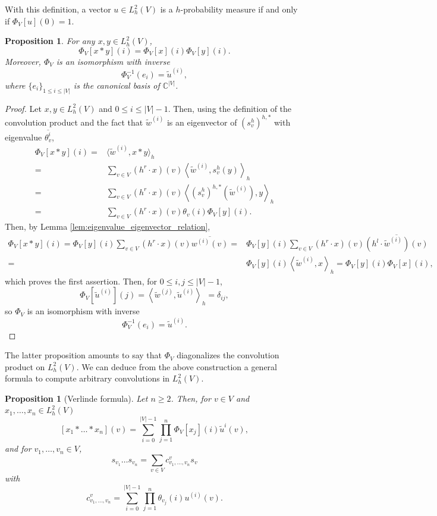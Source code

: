 \documentclass[10pt,11pt]{amsart}%
\newtheorem{proposition}[theorem]{Proposition}
\begin{document}
With this definition, a vector $u\in L^2_h(V)$ is a $h$-probability measure if and only if $\Phi_V[u](0)=1$.
\begin{proposition}\label{prop:diagonalization_Fourier}
For any $x,y\in L^2_h(V)$,
$$\Phi_V[x\ast y](i)=\Phi_V[x](i)\Phi_V[y](i).$$
Moreover, $\Phi_V$ is an isomorphism with inverse
$$\Phi_V^{-1}(e_{i})=\tilde{u}^{(i)},$$
where $\{e_i\}_{1\leq i\leq \vert V\vert}$ is the canonical basis of $\mathbb{C}^{\vert V\vert}$.
\end{proposition}
\begin{proof}
Let $x,y\in L^2_h(V)$ and $0\leq i\leq \vert V\vert-1$. Then, using the definition of the convolution product and the fact that $\tilde{w}^{(i)}$ is an eigenvector of $(s_v^h)^{h,*}$ with eigenvalue $\overline{\theta_v^i}$,
\begin{align*}
\Phi_V[x\ast y](i)=&\langle \tilde{w}^{(i)},x\ast y\rangle_h\\
=&\sum_{v\in V}(h^r\cdot x)(v)\left\langle \tilde{w}^{(i)},s_v^h(y)\right\rangle_h\\
=&\sum_{v\in V}(h^r\cdot x)(v)\left\langle (s_v^h)^{h,*}(\tilde{w}^{(i)}),y\right\rangle_h\\
=&\sum_{v\in V}(h^r\cdot x)(v)\theta_v(i)\Phi_V[y](i).
\end{align*}
Then, by Lemma \ref{lem:eigenvalue_eigenvector_relation},
\begin{align*}
\Phi_V[x\ast y](i)=\Phi_V[y](i)\sum_{v\in V}(h^r\cdot x)(v)\overline{w^{(i)}(v)}=&\Phi_V[y](i)\sum_{v\in V}(h^r\cdot x)(v) \overline{(h^l\cdot \tilde{w}^{(i)})(v)}\\
=&\Phi_V[y](i)\left\langle \tilde{w}^{(i)},x\right\rangle_h=\Phi_V[y](i)\Phi_V[x](i),
\end{align*}
which proves the first assertion. Then, for $0\leq i,j\leq \vert V\vert-1$,
$$\Phi_V\left[\tilde{u}^{(i)}\right](j)=\left\langle \tilde{w}^{(j)},\tilde{u}^{(i)}\right\rangle_h=\delta_{ij},$$
so $\Phi_V$ is an isomorphism with inverse 
$$\Phi_V^{-1}(e_i)=\tilde{u}^{(i)}.$$
\end{proof}
The latter proposition amounts to say that $\Phi_V$ diagonalizes the convolution product on $L^2_h(V)$. We can deduce from the above construction a general formula to compute arbitrary convolutions in $L^2_h(V)$. 
\begin{proposition}[Verlinde formula]\label{prop:Verlinde_formula_general}
Let $n\geq 2$. Then, for $v\in V$ and $x_1,\ldots,x_n\in L^2_h(V)$
$$\left[x_1*\dots *x_n\right](v)=\sum_{i=0}^{|V|-1}\prod_{j=1}^n\Phi_V[x_j](i)\tilde{u}^i(v),$$
and for $v_1,\ldots,v_n\in V$,
$$s_{v_1}\dots s_{v_n}=\sum_{v\in V}c_{v_1,\ldots,v_n}^vs_v$$ 
with 
\begin{equation}\label{eq:Verlinde_formula_general}
c_{v_1,\ldots,v_n}^v=\sum_{i=0}^{|V|-1}\prod_{j=1}^n\theta_{v_j}(i)u^{(i)}(v).
\end{equation}
\end{proposition}
\end{document}
